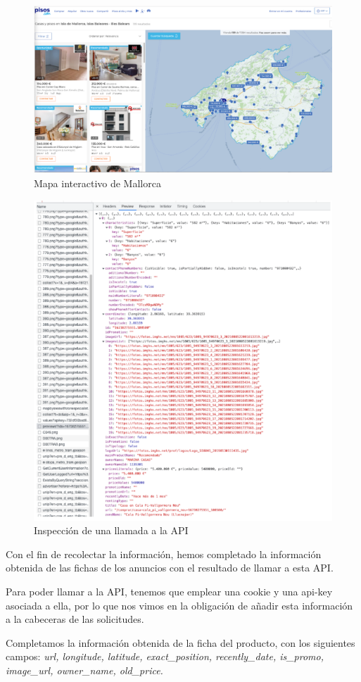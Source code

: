 \documentclass[a4paper, 12pt]{article}
\begin{document}
\begin{enumerate}
	\begin{figure}[H]
		\centering
		\includegraphics[width=0.7\linewidth]{img/screenshot017}
		\caption{Mapa interactivo de Mallorca}
		\label{fig:screenshot017}
	\end{figure}
	
	\begin{figure}[H]
		\centering
		\includegraphics[width=0.7\linewidth]{img/screenshot018}
		\caption{Inspección de una llamada a la API}
		\label{fig:screenshot018}
	\end{figure}
	
	Con el fin de recolectar la información, hemos completado la información obtenida de las fichas de los anuncios con el resultado de llamar a esta API.
	
	Para poder llamar a la API, tenemos que emplear una cookie y una api-key asociada a ella, por lo que nos vimos en la obligación de añadir esta información a la cabeceras de las solicitudes.
	
	Completamos la información obtenida de la ficha del producto, con los siguientes campos: {\itshape url, longitude, latitude, exact\_position, recently\_date, is\_promo, image\_url, owner\_name, old\_price.}
	

\end{enumerate}
\end{document}
